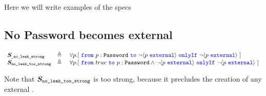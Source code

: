 Here we will write examples of the specs

\subsection{No Password becomes external}

$\begin{array}{lll}

 \Spec{\_no\_leak\_strong} & \triangleq &  \forall p.[\ \onlyIf{p:\prg{Password}} {\neg\external{p}} {\neg\external{p}}\  ] 
\\
 \Spec{no\_leak\_too\_strong} & \triangleq\ & \forall p.[\ \onlyIf{true} {p:\prg{Password} \wedge \neg\external{p}} {\neg\external{p}} \ ] 

\end{array}
$

\noindent
Note that  $\boldmath{S}_{{\texttt{no\_leak\_too\_strong}}} $ is too strong, because it precludes the creation of any external  .